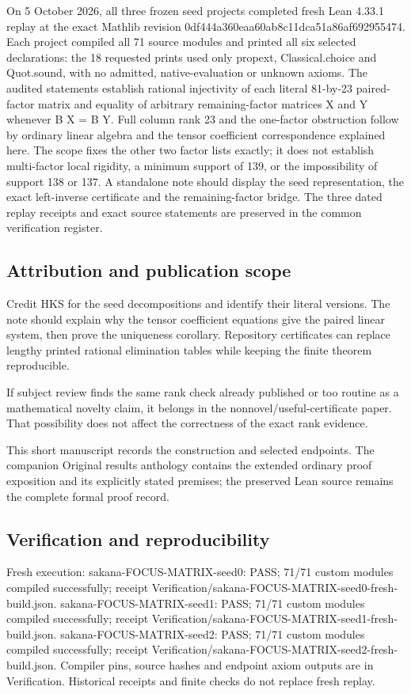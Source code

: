 \documentclass[11pt,a4paper]{article}
\begin{document}
On 5 October 2026, all three frozen seed projects completed fresh Lean 4.33.1 replay at the exact Mathlib revision 0df444a360eaa60ab8c11dca51a86af692955474. Each project compiled all 71 source modules and printed all six selected declarations: the 18 requested prints used only propext, Classical.choice and Quot.sound, with no admitted, native-evaluation or unknown axioms. The audited statements establish rational injectivity of each literal 81-by-23 paired-factor matrix and equality of arbitrary remaining-factor matrices X and Y whenever B X = B Y. Full column rank 23 and the one-factor obstruction follow by ordinary linear algebra and the tensor coefficient correspondence explained here. The scope fixes the other two factor lists exactly; it does not establish multi-factor local rigidity, a minimum support of 139, or the impossibility of support 138 or 137. A standalone note should display the seed representation, the exact left-inverse certificate and the remaining-factor bridge. The three dated replay receipts and exact source statements are preserved in the common verification register.

\subsection{Attribution and publication scope}
Credit HKS for the seed decompositions and identify their literal versions. The note should explain why the tensor coefficient equations give the paired linear system, then prove the uniqueness corollary. Repository certificates can replace lengthy printed rational elimination tables while keeping the finite theorem reproducible.

If subject review finds the same rank check already published or too routine as a mathematical novelty claim, it belongs in the nonnovel/useful-certificate paper. That possibility does not affect the correctness of the exact rank evidence.

{\small This short manuscript records the construction and selected endpoints. The companion Original results anthology contains the extended ordinary proof exposition and its explicitly stated premises; the preserved Lean source remains the complete formal proof record.\par}

\subsection{Verification and reproducibility}
Fresh execution: sakana-FOCUS-MATRIX-seed0: PASS; 71/71 custom modules compiled successfully; receipt Verification/sakana-FOCUS-MATRIX-seed0-fresh-build.json. sakana-FOCUS-MATRIX-seed1: PASS; 71/71 custom modules compiled successfully; receipt Verification/sakana-FOCUS-MATRIX-seed1-fresh-build.json. sakana-FOCUS-MATRIX-seed2: PASS; 71/71 custom modules compiled successfully; receipt Verification/sakana-FOCUS-MATRIX-seed2-fresh-build.json. Compiler pins, source hashes and endpoint axiom outputs are in Verification. Historical receipts and finite checks do not replace fresh replay.
\end{document}
